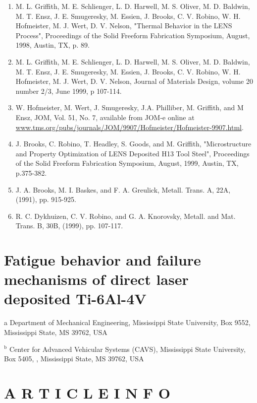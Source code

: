 \documentclass[10pt]{article}
\begin{document}
\begin{enumerate}
  \item M. L. Griffith, M. E. Schlienger, L. D. Harwell, M. S. Oliver, M. D. Baldwin, M. T. Ensz, J. E. Smugeresky, M. Essien, J. Brooks, C. V. Robino, W. H. Hofmeister, M. J. Wert, D. V. Nelson, "Thermal Behavior in the LENS Process", Proceedings of the Solid Freeform Fabrication Symposium, August, 1998, Austin, TX, p. 89.

  \item M. L. Griffith, M. E. Schlienger, L. D. Harwell, M. S. Oliver, M. D. Baldwin, M. T. Ensz, J. E. Smugeresky, M. Essien, J. Brooks, C. V. Robino, W. H. Hofmeister, M. J. Wert, D. V. Nelson, Journal of Materials Design, volume 20 number 2/3, June 1999, p 107-114.

  \item W. Hofmeister, M. Wert, J. Smugeresky, J.A. Philliber, M. Griffith, and M Ensz, JOM, Vol. 51, No. 7, available from JOM-e online at \href{http://www.tms.org/pubs/journals/JOM/9907/Hofmeister/Hofmeister-9907.html}{www.tms.org/pubs/journals/JOM/9907/Hofmeister/Hofmeister-9907.html}.

  \item J. Brooks, C. Robino, T. Headley, S. Goods, and M. Griffith, "Microstructure and Property Optimization of LENS Deposited H13 Tool Steel", Proceedings of the Solid Freeform Fabrication Symposium, August, 1999, Austin, TX, p.375-382.

  \item J. A. Brooks, M. I. Baskes, and F. A. Greulick, Metall. Trans. A, 22A, (1991), pp. 915-925.

  \item R. C. Dykhuizen, C. V. Robino, and G. A. Knorovsky, Metall. and Mat. Trans. B, 30B, (1999), pp. 107-117.

\end{enumerate}

\section*{Fatigue behavior and failure mechanisms of direct laser deposited Ti-6Al-4V }
a Department of Mechanical Engineering, Mississippi State University, Box 9552, Mississippi State, MS 39762, USA

${ }^{\mathrm{b}}$ Center for Advanced Vehicular Systems (CAVS), Mississippi State University, Box 5405, , Mississippi State, MS 39762, USA

\section*{A R T I C L E I N F O}
\end{document}
